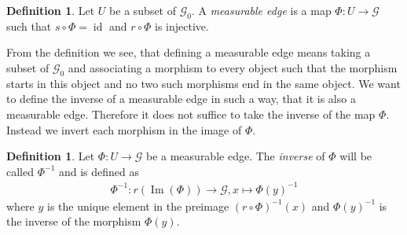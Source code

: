 \documentclass[12pt,a4paper]{scrartcl}
\theoremstyle{plain}
\theoremstyle{definition}
\newtheorem{Definition}[Theorem]{Definition}
\newcommand{\2}{\mathbb{Z} / 2 \mathbb{Z}}
\newcommand{\G}{\mathcal{G}}
\newcommand{\1}{\bar{1}}
\newcommand{\0}{\bar{0}}
\newcommand{\id}{\operatorname{id}}
\newcommand{\Ima}{\operatorname{Im}}
\begin{document}
\begin{Definition}
	Let $U$ be a subset of $\G_0$. A \emph{measurable edge} is a map $\Phi\colon U \to \G$ such that $s \circ \Phi = \id$ and $r \circ \Phi$ is injective.
\end{Definition}
From the definition we see, that defining a measurable edge means taking a subset of $\G_0$ and associating a morphism to every object such that the morphism starts in this object and no two such morphisms end in the same object. We want to define the inverse of a measurable edge in such a way, that it is also a measurable edge. Therefore it does not suffice to take the inverse of the map $\Phi$. Instead we invert each morphism in the image of $\Phi$.
\begin{Definition} \label{inv_meas}
	Let $\Phi\colon U \to \G$ be a measurable edge. The \emph{inverse} of $\Phi$ will be called $\Phi^{-1}$ and is defined as \begin{align*}
		\Phi^{-1}\colon r(\Ima(\Phi)) \to \G, x \mapsto \Phi (y)^{-1}
	\end{align*}
	where $y$ is the unique element in the preimage $(r \circ \Phi)^{-1} (x)$ and $\Phi (y)^{-1}$ is the inverse of the morphism $\Phi (y)$.
\end{Definition}
\end{document}
